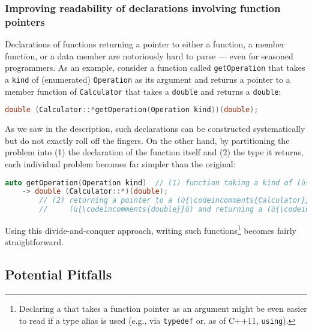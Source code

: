 \subsubsection[Improving readability of declarations involving function pointers]{Improving readability of declarations involving function pointers}\label{improving-readability-of-declarations-involving-function-pointers}

Declarations of functions returning a pointer to either a function, a member function, or a data member are notoriously hard to parse --- even for seasoned programmers. As an example, consider a function called
\lstinline!getOperation! that takes a \lstinline!kind! of
(enumerated) \lstinline!Operation! as its argument and returns a pointer to a member
function of \lstinline!Calculator! that takes a \lstinline!double! and
returns a \lstinline!double!:

\begin{lstlisting}[language=C++]
double (Calculator::*getOperation(Operation kind))(double);
\end{lstlisting}

\noindent As we saw in the description, such declarations can be constructed
systematically but do not exactly roll off the fingers. On the other
hand, by partitioning the problem into (1) the declaration of the
function itself and (2) the type it returns, each individual problem
becomes far simpler than the original:

\begin{lstlisting}[language=C++]
auto getOperation(Operation kind)  // (1) function taking a kind of (ù{\codeincomments{Operation}}ù)
    -> double (Calculator::*)(double);
        // (2) returning a pointer to a (ù{\codeincomments{Calculator}}ù) member function taking a
        //     (ù{\codeincomments{double}}ù) and returning a (ù{\codeincomments{double}}ù)
\end{lstlisting}

\noindent Using this divide-and-conquer approach, writing such functions{\cprotect\footnote{Declaring a  that
takes a function pointer as an argument might be even easier to read
if a type alias is used (e.g., via \lstinline!typedef! or, as of C++11,
  \lstinline!using!).}} becomes fairly straightforward.

\subsection[Potential Pitfalls]{Potential Pitfalls}\label{potential-pitfalls}


